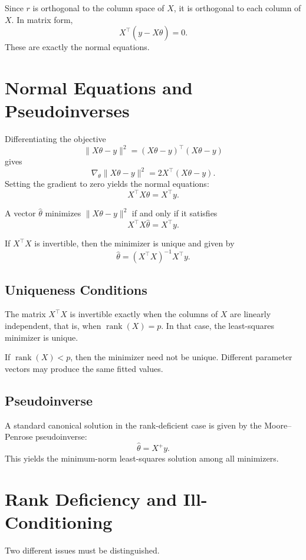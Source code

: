 Since $r$ is orthogonal to the column space of $X$, it is orthogonal to each column of $X$. In matrix form,
\[
X^\top(y-X\hat\theta)=0.
\]
These are exactly the normal equations.

\section{Normal Equations and Pseudoinverses}

Differentiating the objective
\[
\|X\theta-y\|^2=(X\theta-y)^\top(X\theta-y)
\]
gives
\[
\nabla_\theta \|X\theta-y\|^2 = 2X^\top(X\theta-y).
\]
Setting the gradient to zero yields the normal equations:
\[
X^\top X\theta = X^\top y.
\]

\begin{theorem}
A vector $\hat\theta$ minimizes $\|X\theta-y\|^2$ if and only if it satisfies
\[
X^\top X\hat\theta=X^\top y.
\]
\end{theorem}

If $X^\top X$ is invertible, then the minimizer is unique and given by
\[
\hat\theta=(X^\top X)^{-1}X^\top y.
\]

\subsection{Uniqueness Conditions}

The matrix $X^\top X$ is invertible exactly when the columns of $X$ are linearly independent, that is, when $\operatorname{rank}(X)=p$. In that case, the least-squares minimizer is unique.

If $\operatorname{rank}(X)<p$, then the minimizer need not be unique. Different parameter vectors may produce the same fitted values.

\subsection{Pseudoinverse}

A standard canonical solution in the rank-deficient case is given by the Moore--Penrose pseudoinverse:
\[
\hat\theta = X^+ y.
\]
This yields the minimum-norm least-squares solution among all minimizers.

\section{Rank Deficiency and Ill-Conditioning}

Two different issues must be distinguished.

